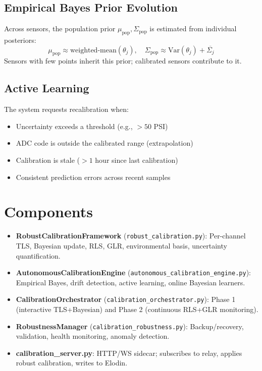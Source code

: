 \documentclass[11pt]{article}
\begin{document}
\subsection{Empirical Bayes Prior Evolution}

Across sensors, the population prior $\mu_{\text{pop}}, \Sigma_{\text{pop}}$ is estimated from individual posteriors:
\[
\mu_{\text{pop}} \approx \text{weighted-mean}(\theta_j), \quad
\Sigma_{\text{pop}} \approx \text{Var}(\theta_j) + \overline{\Sigma_j}
\]
Sensors with few points inherit this prior; calibrated sensors contribute to it.

\subsection{Active Learning}

The system requests recalibration when:
\begin{itemize}
\item Uncertainty exceeds a threshold (e.g., $> 50$ PSI)
\item ADC code is outside the calibrated range (extrapolation)
\item Calibration is stale ($> 1$ hour since last calibration)
\item Consistent prediction errors across recent samples
\end{itemize}

\section{Components}

\begin{itemize}
\item \textbf{RobustCalibrationFramework} (\texttt{robust\_calibration.py}): Per-channel TLS, Bayesian update, RLS, GLR, environmental basis, uncertainty quantification.
\item \textbf{AutonomousCalibrationEngine} (\texttt{autonomous\_calibration\_engine.py}): Empirical Bayes, drift detection, active learning, online Bayesian learners.
\item \textbf{CalibrationOrchestrator} (\texttt{calibration\_orchestrator.py}): Phase 1 (interactive TLS+Bayesian) and Phase 2 (continuous RLS+GLR monitoring).
\item \textbf{RobustnessManager} (\texttt{calibration\_robustness.py}): Backup/recovery, validation, health monitoring, anomaly detection.
\item \textbf{calibration\_server.py}: HTTP/WS sidecar; subscribes to relay, applies robust calibration, writes to Elodin.
\end{itemize}
\end{document}
